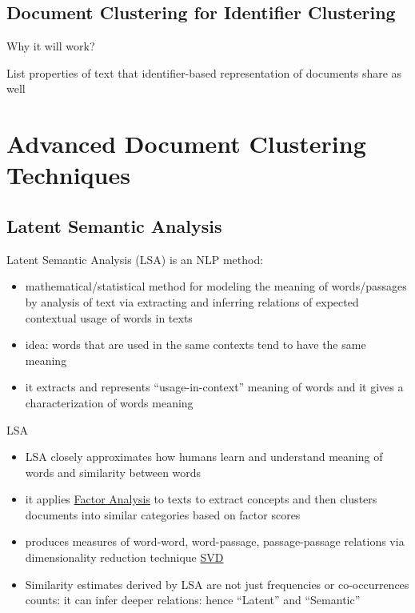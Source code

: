 \subsection{Document Clustering for Identifier Clustering}

Why it will work?

List properties of text that identifier-based representation of documents share as well



\section{Advanced Document Clustering Techniques}


\subsection{Latent Semantic Analysis}

Latent Semantic Analysis (LSA) is an NLP method:

\begin{itemize}
\itemsep1pt\parskip0pt
\item
  mathematical/statistical method for modeling the meaning of
  words/passages by analysis of text via extracting and inferring
  relations of expected contextual usage of words in texts
\item
  idea: words that are used in the same contexts tend to have the same
  meaning
\item
  it extracts and represents ``usage-in-context'' meaning of words and
  it gives a characterization of words meaning
\end{itemize}

LSA

\begin{itemize}
\itemsep1pt\parskip0pt
\item
  LSA closely approximates how humans learn and understand meaning of
  words and similarity between words
\item
  it applies \href{Factor Analysis}{Factor Analysis} to texts to extract
  concepts and then clusters documents into similar categories based on
  factor scores
\item
  produces measures of word-word, word-passage, passage-passage
  relations via dimensionality reduction technique \url{SVD}
\item
  Similarity estimates derived by LSA are not just frequencies or
  co-occurrences counts: it can infer deeper relations: hence ``Latent''
  and ``Semantic''
\end{itemize}

